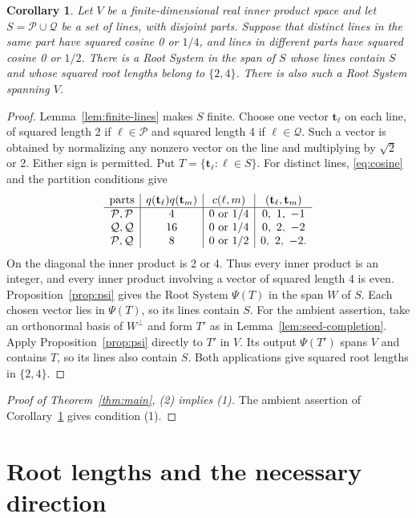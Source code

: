 \documentclass[11pt]{amsart}
\newcommand\cP{{\mathcal P}}
\newcommand\cQ{{\mathcal Q}}
\newtheorem{corollary}[theorem]{Corollary}
\theoremstyle{definition}
\newcommand{\Zt}{{\mathbf t}}
\begin{document}
\begin{corollary}\label{cor:normalized-containment}
Let $V$ be a finite-dimensional real inner product space and let
$S=\cP\cup\cQ$ be a set of lines, with disjoint parts. Suppose that
distinct lines in the same part have squared cosine 0 or $1/4$, and
lines in different parts have squared cosine 0 or $1/2$.
There is a Root System in the span of $S$ whose lines contain $S$
and whose squared root lengths belong to $\{2,4\}$. There is also
such a Root System spanning $V$.
\end{corollary}
\begin{proof}
Lemma~\ref{lem:finite-lines} makes $S$ finite. Choose one vector
$\Zt_\ell$ on each line, of squared length 2 if $\ell\in\cP$
and squared length 4 if $\ell\in\cQ$. Such a vector is obtained
by normalizing any nonzero vector on the line and multiplying by
$\sqrt2$ or 2. Either sign is permitted. Put
$T=\{\Zt_\ell:\ell\in S\}$.
For distinct lines, \eqref{eq:cosine} and the partition conditions give
\[
\begin{array}{c|c|c|c}
\hbox{parts}&q(\Zt_\ell)q(\Zt_m)&c(\ell,m)&(\Zt_\ell,\Zt_m)\\\hline
\cP,\cP&4&0\hbox{ or }1/4&0,\ 1,\ -1\\
\cQ,\cQ&16&0\hbox{ or }1/4&0,\ 2,\ -2\\
\cP,\cQ&8&0\hbox{ or }1/2&0,\ 2,\ -2.
\end{array}
\]
On the diagonal the inner product is 2 or 4. Thus every inner product
is an integer, and every inner product involving a vector of squared
length 4 is even. Proposition~\ref{prop:psi} gives the Root System
$\Psi(T)$ in the span $W$ of $S$. Each chosen vector lies in
$\Psi(T)$, so its lines contain $S$.
For the ambient assertion, take an orthonormal basis of $W^\perp$ and
form $T'$ as in Lemma~\ref{lem:seed-completion}. Apply
Proposition~\ref{prop:psi} directly to $T'$ in $V$. Its output
$\Psi(T')$ spans $V$ and contains $T$, so its lines also contain $S$.
Both applications give squared root lengths in $\{2,4\}$.
\end{proof}

\begin{proof}[Proof of Theorem~\ref{thm:main}, (2) implies (1)]
The ambient assertion of Corollary~\ref{cor:normalized-containment}
gives condition (1).
\end{proof}

\section{Root lengths and the necessary direction}\label{sec:necessity}
\end{document}
